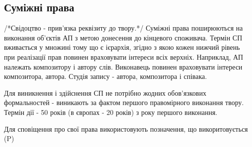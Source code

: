 \subsection{Суміжні права}
/*Свідоцтво - прив’язка реквізиту до твору.*/
Суміжні права поширюються на виконання об’єктів АП з метою донесення до кінцевого споживача. Термін СП вживається у множині тому що є ієрархія, згідно з якою кожен нижчий рівень при реалізації прав повинен враховувати інтереси всіх верхніх. Наприклад, АП належать композитору і автору слів. Виконавець повинен враховувати інтереси композитора, автора. Студія запису - автора, композитора і співака. 

Для виникнення і здійснення СП не потрібно жодних обов’язкових формальностей - виникають за фактом першого правомірного виконання твору. Термін дії - 50 років (в європах - 20 років) з року першого виконання.

Для сповіщення про свої права використовують позначення, що викоритовується (P) 